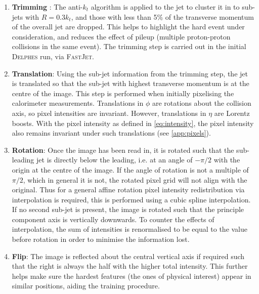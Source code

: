 \documentclass[twocolumn]{article}
\newcommand{\pkg}[1]{\textsc{#1}}
\begin{document}
\begin{enumerate}
	\item \textbf{Trimming} \cite{trimming}: The anti-$k_t$ algorithm is applied to the jet to cluster it in to sub-jets with $R = 0.3 k_t$, and those with less than 5\% of the transverse momentum of the overall jet are dropped. This helps to highlight the hard event under consideration, and reduces the effect of pileup (multiple proton-proton collisions in the same event). The trimming step is carried out in the initial \pkg{Delphes} run, via \pkg{FastJet}.
	
	
	\item \textbf{Translation}: Using the sub-jet information from the trimming step, the jet is translated so that the sub-jet with highest transverse momentum is at the centre of the image. This step is performed when initially pixelising the calorimeter measurements. Translations in $\phi$ are rotations about the collision axis, so pixel intensities are invariant. However, translations in $\eta$ are Lorentz boosts. With the pixel intensity as defined in \cref{eq:intensity}, the pixel intensity also remains invariant under such translations (see \cref{app:pixels}).

	\item \textbf{Rotation}: Once the image has been read in, it is rotated such that the sub-leading jet is directly below the leading, i.e. at an angle of $-\pi/2$ with the origin at the centre of the image. If the angle of rotation is not a multiple of $\pi/2$, which in general it is not, the rotated pixel grid will not align with the original. Thus for a general affine rotation pixel intensity redistribution via interpolation is required, this is performed using a cubic spline interpolation. If no second sub-jet is present, the image is rotated such that the principle component axis is vertically downwards. To counter the effects of interpolation, the sum of intensities is renormalised to be equal to the value before rotation in order to minimise the information lost.
	
	\item \textbf{Flip}:  The image is reflected about the central vertical axis if required such that the right is always the half with the higher total intensity. This further helps make sure the hardest features (the ones of physical interest) appear in similar positions, aiding the training procedure. 
	
\end{enumerate}
\end{document}
